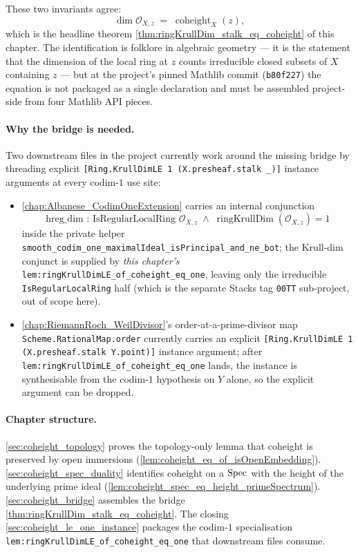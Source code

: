 These two invariants agree:
\[
  \dim \mathcal{O}_{X,z} \;=\; \operatorname{coheight}_X(z),
\]
which is the headline theorem \cref{thm:ringKrullDim_stalk_eq_coheight} of this
chapter. The identification is folklore in algebraic geometry --- it is the
statement that the dimension of the local ring at \(z\) counts irreducible
closed subsets of \(X\) containing \(z\) --- but at the project's pinned Mathlib
commit (\texttt{b80f227}) the equation is not packaged as a single declaration
and must be assembled project-side from four Mathlib API pieces.

\paragraph{Why the bridge is needed.} Two downstream files in the project
currently work around the missing bridge by threading explicit
\texttt{[Ring.KrullDimLE 1 (X.presheaf.stalk \_)]} instance arguments at every
codim-\(1\) use site:
\begin{itemize}
  \item \cref{chap:Albanese_CodimOneExtension} carries an internal conjunction
    \[
      \text{hreg\_dim : IsRegularLocalRing\ } \mathcal{O}_{X,z} \;\wedge\;
      \operatorname{ringKrullDim}(\mathcal{O}_{X,z}) = 1
    \]
    inside the private helper
    \texttt{smooth\_codim\_one\_maximalIdeal\_isPrincipal\_and\_ne\_bot};
    the Krull-dim conjunct is supplied by \emph{this chapter's}
    \texttt{lem:ringKrullDimLE_of_coheight_eq_one}, leaving only the
    irreducible \texttt{IsRegularLocalRing} half (which is the separate
    Stacks tag \texttt{00TT} sub-project, out of scope here).
  \item \cref{chap:RiemannRoch_WeilDivisor}'s order-at-a-prime-divisor map
    \texttt{Scheme.RationalMap.order} currently carries an explicit
    \texttt{[Ring.KrullDimLE 1 (X.presheaf.stalk Y.point)]} instance argument;
    after \texttt{lem:ringKrullDimLE_of_coheight_eq_one} lands, the instance is
    synthesisable from the codim-\(1\) hypothesis on \(Y\) alone, so the explicit
    argument can be dropped.
\end{itemize}

\paragraph{Chapter structure.} \cref{sec:coheight_topology} proves the
topology-only lemma that coheight is preserved by open immersions
(\cref{lem:coheight_eq_of_isOpenEmbedding}). \cref{sec:coheight_spec_duality}
identifies coheight on a \(\operatorname{Spec}\) with the height of the underlying prime ideal
(\cref{lem:coheight_spec_eq_height_primeSpectrum}). \cref{sec:coheight_bridge}
assembles the bridge \cref{thm:ringKrullDim_stalk_eq_coheight}. The closing
\cref{sec:coheight_le_one_instance} packages the codim-\(1\) specialisation
\texttt{lem:ringKrullDimLE_of_coheight_eq_one} that downstream files consume.

